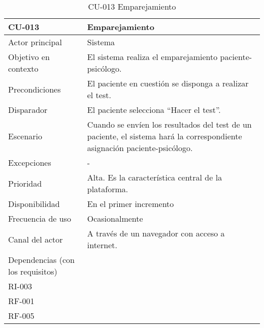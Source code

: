 %
%

\begin{table}[htbp]
\centering
\caption{CU-013 Emparejamiento}                        
\begin{tabularx}{\textwidth}{|X|X|}
\hline
CU-013                            & Emparejamiento                                                                                                             \\ \hline
Actor principal                   & Sistema                                                                                                                    \\ \hline
Objetivo en contexto              & El sistema realiza el emparejamiento paciente-psicólogo.                                                                   \\ \hline
Precondiciones                    & El paciente en cuestión se disponga a realizar el test.                                                                    \\ \hline
Disparador                        & El paciente selecciona “Hacer el test”.                                                                                    \\ \hline
Escenario                         & Cuando se envíen los resultados del test de un paciente, el sistema hará la correspondiente asignación paciente-psicólogo. \\ \hline
Excepciones                       & -                                                                                                                          \\ \hline
Prioridad                         & Alta. Es la característica central de la plataforma.                                                                       \\ \hline
Disponibilidad                    & En el primer incremento                                                                                                    \\ \hline
Frecuencia de uso                 & Ocasionalmente                                                                                                             \\ \hline
Canal del actor                   & A través de un navegador con acceso a internet.                                                                            \\ \hline
Dependencias (con los requisitos) & \begin{tabular}[c]{@{}l@{}}RI-001\\ RI-003\\ RF-001\\ RF-005\end{tabular}                                                  \\ \hline
\end{tabularx}
\end{table}

